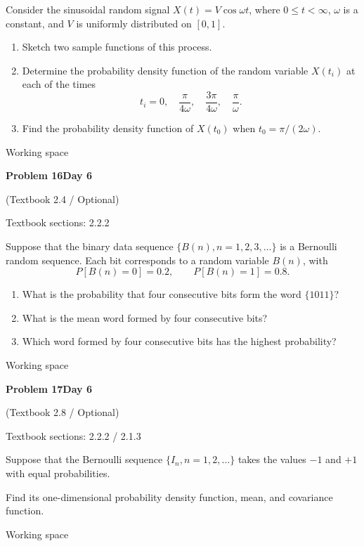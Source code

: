 \documentclass[11pt]{article}
\newcommand{\qtitle}[2]{\clearpage\begin{tcolorbox}[colback=navy,colframe=navy,arc=1.5pt,boxrule=0pt]\color{white}\large\bfseries #1\hfill\small #2\end{tcolorbox}}
\begin{document}
\begin{tcolorbox}[colback=qbg,colframe=qbg,boxrule=0pt]Consider the sinusoidal random signal $X(t)=V\cos\omega t$, where $0\le t<\infty$, $\omega$ is a constant, and $V$ is uniformly distributed on $[0,1]$.
\begin{enumerate}
\item Sketch two sample functions of this process.
\item Determine the probability density function of the random variable $X(t_i)$ at each of the times
\[
t_i=0,\quad\frac{\pi}{4\omega},\quad\frac{3\pi}{4\omega},\quad\frac{\pi}{\omega}.
\]
\item Find the probability density function of $X(t_0)$ when $t_0=\pi/(2\omega)$.
\end{enumerate}
\end{tcolorbox}\smallskip\begin{workspace}\hfill{\color{linec}\footnotesize Working space}\end{workspace}
\qtitle{Problem 16}{Day 6}
{\small\color{accentred}(Textbook 2.4 / Optional)}\par\smallskip
{\small\color{muted}Textbook sections: 2.2.2}\par\medskip
\begin{tcolorbox}[colback=qbg,colframe=qbg,boxrule=0pt]Suppose that the binary data sequence $\{B(n),n=1,2,3,\ldots\}$ is a Bernoulli random sequence. Each bit corresponds to a random variable $B(n)$, with
\[
P[B(n)=0]=0.2,\qquad P[B(n)=1]=0.8.
\]
\begin{enumerate}
\item What is the probability that four consecutive bits form the word $\{1011\}$?
\item What is the mean word formed by four consecutive bits?
\item Which word formed by four consecutive bits has the highest probability?
\end{enumerate}
\end{tcolorbox}\smallskip\begin{workspace}\hfill{\color{linec}\footnotesize Working space}\end{workspace}
\qtitle{Problem 17}{Day 6}
{\small\color{accentred}(Textbook 2.8 / Optional)}\par\smallskip
{\small\color{muted}Textbook sections: 2.2.2 / 2.1.3}\par\medskip
\begin{tcolorbox}[colback=qbg,colframe=qbg,boxrule=0pt]Suppose that the Bernoulli sequence $\{I_n,n=1,2,\ldots\}$ takes the values $-1$ and $+1$ with equal probabilities.

Find its one-dimensional probability density function, mean, and covariance function.
\end{tcolorbox}\smallskip\begin{workspace}\hfill{\color{linec}\footnotesize Working space}\end{workspace}
\end{document}
